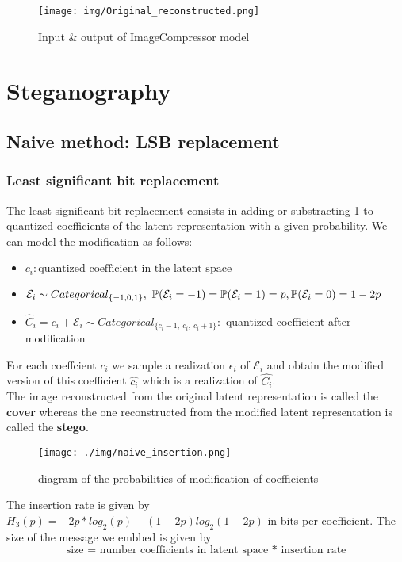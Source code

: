 \documentclass[12pt]{article}
\begin{document}
\begin{figure}[H]
    \centering
    \texttt{[image: img/Original\_reconstructed.png]}
    \caption[Image uncompressed \& AI compressed]{Input \& output of ImageCompressor model}
\end{figure}

\section{Steganography}
\subsection{Naive method: LSB replacement}
\subsubsection{Least significant bit replacement}
The least significant bit replacement consists in adding or substracting 1 to quantized coefficients of the latent representation with a given probability. We can model the modification as follows:

\begin{itemize}
    \item $c_i: \text{quantized coefficient in the latent space}$
    \item $\mathcal{E}
    _i \sim Categorical_{\{-1,0,1\}},\\
    \ \mathbb{P}(\mathcal{E}_i = -1) = \mathbb{P}(\mathcal{E}_i = 1) = p,\\
    \mathbb{P}(\mathcal{E}_i = 0) = 1-2p$ 
    \item $\hat{C}_i = c_i + \mathcal{E}_i \sim Categorical_{\{c_i-1,\ c_i,\ c_i+1\}}:$ quantized coefficient after modification
\end{itemize}

For each coeffcient $c_i$ we sample a realization $\epsilon_i$ of $\mathcal{E}_i$ and obtain the modified version of this coefficient $\hat{c_i}$ which is a realization of $\hat{C_i}$.\\
The image reconstructed from the original latent representation is called the \textbf{cover} whereas the one reconstructed from the modified latent representation is called the \textbf{stego}.

\begin{figure}[H]
    \centering
    \texttt{[image: ./img/naive\_insertion.png]}
    \caption[Diagram of the probabilities of modification of coefficients]{diagram of the probabilities of modification of coefficients}
    \label{fig:probabilities}
\end{figure}
The insertion rate is given by $H_3(p) = -2p*log_2(p) - (1-2p)log_2(1-2p)$ in bits per coefficient. The size of the message we embbed is given by \[\text{size = number coefficients in latent space * insertion rate}\]
\end{document}
